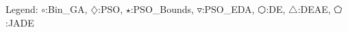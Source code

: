 Legend: {\color{NavyBlue}$\circ$}:Bin\_GA, {\color{Magenta}$\diamondsuit$}:PSO, {\color{Orange}$\star$}:PSO\_Bounds, {\color{CornflowerBlue}$\triangledown$}:PSO\_EDA, {\color{red}$\varhexagon$}:DE, {\color{YellowGreen}$\triangle$}:DEAE, {\color{cyan}$\pentagon$}:JADE